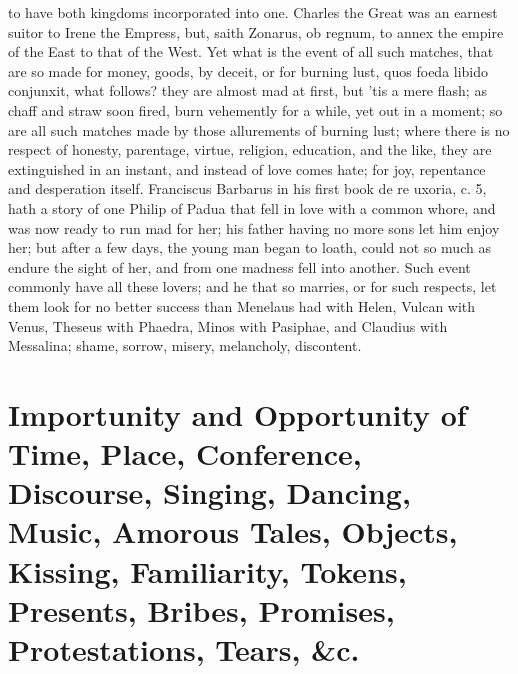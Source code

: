 {to have both kingdoms incorporated into one. Charles the Great was an
earnest suitor to Irene the Empress, but, saith Zonarus, ob
regnum, to annex the empire of the East to that of the West. Yet what
is the event of all such matches, that are so made for money, goods, by
deceit, or for burning lust, quos foeda libido conjunxit, what follows?
they are almost mad at first, but 'tis a mere flash; as chaff and straw
soon fired, burn vehemently for a while, yet out in a moment; so are
all such matches made by those allurements of burning lust; where there
is no respect of honesty, parentage, virtue, religion, education, and
the like, they are extinguished in an instant, and instead of love
comes hate; for joy, repentance and desperation itself. Franciscus
Barbarus in his first book de re uxoria, c. 5, hath a story of one
Philip of Padua that fell in love with a common whore, and was now
ready to run mad for her; his father having no more sons let him enjoy
her; but after a few days, the young man began to loath, could
not so much as endure the sight of her, and from one madness fell into
another. Such event commonly have all these lovers; and he that so
marries, or for such respects, let them look for no better success than
Menelaus had with Helen, Vulcan with Venus, Theseus with Phaedra, Minos
with Pasiphae, and Claudius with Messalina; shame, sorrow, misery,
melancholy, discontent.

\section[Importunity and Opportunity of Time, Place\ldots{}]{Importunity and Opportunity of Time, Place, Conference, Discourse, Singing, Dancing, Music, Amorous Tales, Objects, Kissing, Familiarity, Tokens, Presents, Bribes, Promises, Protestations, Tears, \&c.}

}
